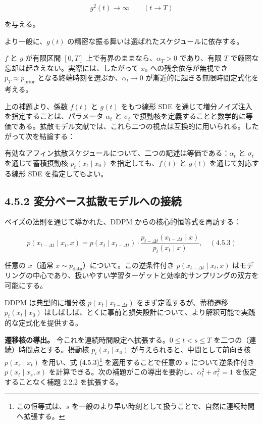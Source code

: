 \[
g^2(t)\to\infty \qquad (t\to T)
\]


を与える。

より一般に、$g(t)$ の精密な振る舞いは選ばれたスケジュールに依存する。

$f$ と $g$ が有限区間 $[0,T]$ 上で有界のままなら、$\alpha_T>0$ であり、有限 $T$ で厳密な忘却は起きえない。実際には、したがって $x_0$ への残余依存が無視でき $p_T\approx p_{\mathrm{prior}}$ となる終端時刻を選ぶか、$\alpha_t\to 0$ が漸近的に起きる無限時間定式化を考える。

上の補題より、係数 $f(t)$ と $g(t)$ をもつ線形 SDE を通じて増分ノイズ注入を指定することは、パラメータ $\alpha_t$ と $\sigma_t$ で摂動核を定義することと数学的に等価である。拡散モデル文献では、これら二つの視点は互換的に用いられる。したがって次を結論する：

\begin{propositionbox}[観察 4.5.1:]
有効なアフィン拡散スケジュールについて、二つの記述は等価である：$\alpha_t$ と $\sigma_t$ を通じて蓄積摂動核 $p_t(x_t\mid x_0)$ を指定しても、$f(t)$ と $g(t)$ を通じて対応する線形 SDE を指定してもよい。
\end{propositionbox}


\subsection*{4.5.2 変分ベース拡散モデルへの接続}


ベイズの法則を通じて導かれた、DDPM からの核心的恒等式を再訪する：

\[
p(x_{t-\Delta t}\mid x_t,x)
= p(x_t\mid x_{t-\Delta t})\cdot\frac{p_{t-\Delta t}(x_{t-\Delta t}\mid x)}{p_t(x_t\mid x)}, \quad (4.5.3)
\]


任意の $x$（通常 $x\sim p_{\mathrm{data}}$）について。この逆条件付き $p(x_{t-\Delta t}\mid x_t,x)$ はモデリングの中心であり、扱いやすい学習ターゲットと効率的サンプリングの双方を可能にする。

DDPM は典型的に増分核 $p(x_t\mid x_{t-\Delta t})$ をまず定義するが、蓄積遷移 $p_t(x_t\mid x_0)$ はしばしば、とくに事前と損失設計について、より解釈可能で実践的な定式化を提供する。

\textbf{遷移核の導出。} 今これを連続時間設定へ拡張する。$0\le t<s\le T$ を二つの（連続）時間点とする。摂動核 $p_t(x_t\mid x_0)$ が与えられると、中間として前向き核 $p(x_s\mid x_t)$ を用い、式 (4.5.3)\footnote{この恒等式は、$s$ を一般のより早い時刻として扱うことで、自然に連続時間へ拡張する。} を適用することで任意の $x$ について逆条件付き $p(x_t\mid x_s,x)$ を計算できる。次の補題がこの導出を要約し、$\alpha_t^2+\sigma_t^2=1$ を仮定することなく補題 2.2.2 を拡張する。

